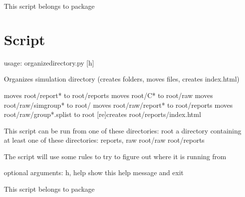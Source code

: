 \documentclass[letterpaper,10pt,english]{sphinxmanual}
\begin{document}
This script belongs to package 


\section{Script }
\label{\detokenize{autoscripts/script-organize-directory:script-organize-directory-py}}\label{\detokenize{autoscripts/script-organize-directory::doc}}
\begin{sphinxVerbatim}[commandchars=\\\{\}]
usage: organize\PYGZhy{}directory.py [\PYGZhy{}h]

Organizes simulation directory (creates folders, moves files, creates \PYGZsq{}index.html\PYGZsq{})

  \PYGZhy{} moves \PYGZsq{}root/report\PYGZhy{}*\PYGZsq{}       to \PYGZsq{}root/reports\PYGZsq{}
  \PYGZhy{} moves \PYGZsq{}root/C*\PYGZsq{}             to \PYGZsq{}root/raw\PYGZsq{}
  \PYGZhy{} moves \PYGZsq{}root/raw/simgroup*\PYGZsq{}  to \PYGZsq{}root/\PYGZsq{}
  \PYGZhy{} moves \PYGZsq{}root/raw/report\PYGZhy{}*\PYGZsq{}   to \PYGZsq{}root/reports\PYGZsq{}
  \PYGZhy{} moves \PYGZsq{}root/raw/group*.splist\PYGZsq{}   to \PYGZsq{}root\PYGZsq{}
  \PYGZhy{} [re]creates \PYGZsq{}root/reports/index.html\PYGZsq{}

This script can be run from one of these directories:
  \PYGZhy{} \PYGZsq{}root\PYGZsq{} \PYGZhy{}\PYGZhy{} a directory containing at least one of these directories: \PYGZsq{}reports\PYGZsq{}, \PYGZsq{}raw\PYGZsq{}
  \PYGZhy{} \PYGZsq{}root/raw\PYGZsq{}
  \PYGZhy{} \PYGZsq{}root/reports\PYGZsq{}

The script will use some rules to try to figure out where it is running from

optional arguments:
  \PYGZhy{}h, \PYGZhy{}\PYGZhy{}help  show this help message and exit
\end{sphinxVerbatim}

This script belongs to package 
\end{document}
